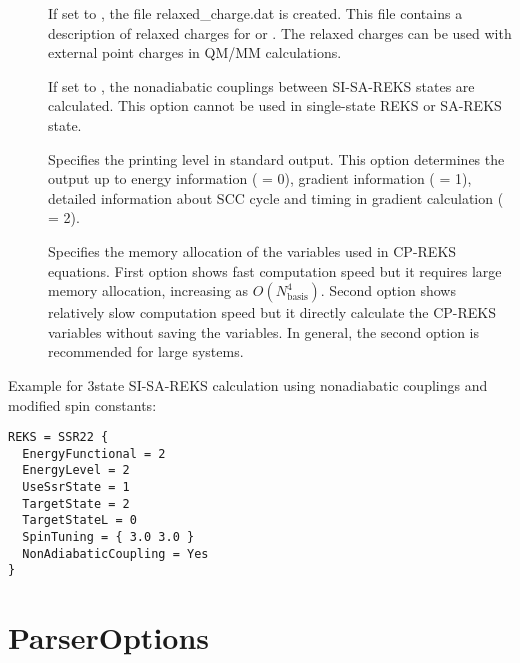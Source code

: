 \begin{description}
  \item[] If set to , the file relaxed\_charge.dat is created. This file contains
    a description of relaxed charges for  or . The relaxed charges can
    be used with external point charges in QM/MM calculations.

  \item[] If set to , the nonadiabatic couplings between SI-SA-REKS
    states are calculated. This option cannot be used in single-state REKS or SA-REKS state.

  \item[] Specifies the printing level in standard output. This option determines the output up to
    energy information ( = 0), gradient information ( = 1), detailed information about
    SCC cycle and timing in gradient calculation ( = 2).

  \item[] Specifies the memory allocation of the variables used in CP-REKS equations.
    First option shows fast computation speed but it requires large memory allocation, increasing as
    $O(N_\mathrm{basis}^4)$. Second option shows relatively slow computation speed but it directly calculate
    the CP-REKS variables without saving the variables. In general, the second option is recommended for large systems.

  \end{description}

Example for 3state SI-SA-REKS calculation using nonadiabatic couplings and modified spin constants:
\begin{verbatim}
REKS = SSR22 {
  EnergyFunctional = 2
  EnergyLevel = 2
  UseSsrState = 1
  TargetState = 2
  TargetStateL = 0
  SpinTuning = { 3.0 3.0 }
  NonAdiabaticCoupling = Yes
}
\end{verbatim}

\section{ParserOptions}
\label{sec:dftbp.ParserOptions}

